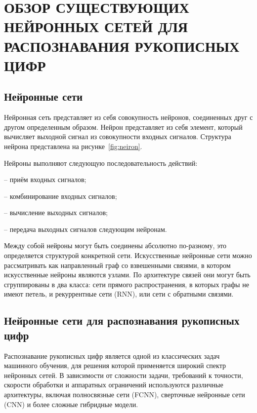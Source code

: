 \chapter[Обзор существующих нейронных сетей для распознавания рукописных цифр]
{ОБЗОР СУЩЕСТВУЮЩИХ НЕЙРОННЫХ СЕТЕЙ ДЛЯ РАСПОЗНАВАНИЯ РУКОПИСНЫХ ЦИФР}

\section{Нейронные сети}\par
\hspace*{12.5 mm}Нейронная сеть представляет из себя совокупность нейронов,
соединенных друг с другом определенным образом. Нейрон представляет из себя 
элемент, который вычисляет выходной сигнал из совокупности входных сигналов.
Структура нейрона представлена на рисунке~\ref{fig:neiron}.


Нейроны выполняют следующую последовательность действий:

– приём входных сигналов;

– комбинирование входных сигналов;

– вычисление выходных сигналов;

– передача выходных сигналов следующим нейронам.

Между собой нейроны могут быть соединены абсолютно по-разному, это
определяется структурой конкретной сети. Искусственные нейронные сети 
можно рассматривать как направленный граф со взвешенными связями, в котором 
искусственные нейроны являются узлами. По архитектуре связей они могут быть 
сгруппированы в два класса: сети прямого распространения, в которых графы не 
имеют петель, и рекуррентные сети (RNN), или сети с обратными связями.

\section{Нейронные сети для распознавания рукописных цифр}\par
\hspace*{12.5 mm}Распознавание рукописных цифр является одной из классических 
задач машинного обучения, для решения которой применяется широкий спектр 
нейронных сетей. В зависимости от сложности задачи, требований к точности, 
скорости обработки и аппаратных ограничений используются различные архитектуры, 
включая полносвязные сети (FCNN), сверточные нейронные сети (CNN) и более 
сложные гибридные модели.

